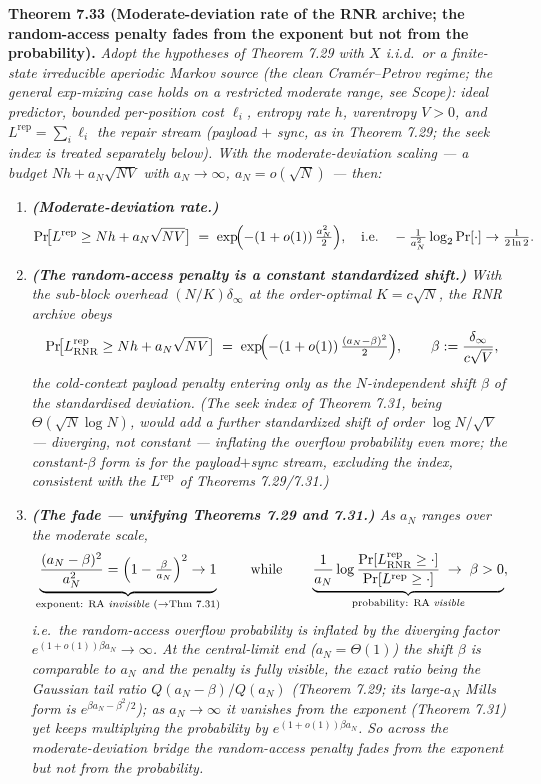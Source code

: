 \documentclass[
]{article}
\begin{document}
\textbf{Theorem 7.33 (Moderate-deviation rate of the RNR archive; the random-access
penalty fades from the exponent but not from the probability).} \emph{Adopt the
hypotheses of Theorem 7.29 with $X$ \emph{i.i.d.\ or a finite-state irreducible
aperiodic Markov} source (the clean Cram\'er--Petrov regime; the general exp-mixing
case holds on a restricted moderate range, see Scope): ideal predictor, bounded
per-position cost $\ell_i$, entropy rate $h$, varentropy $V>0$, and
$L^{\mathrm{rep}}=\sum_i\ell_i$ the \emph{repair stream} (payload $+$ sync, as in
Theorem 7.29; the seek index is treated separately below). With the
\emph{moderate-deviation} scaling --- a budget $Nh+a_N\sqrt{NV}$ with $a_N\to\infty$,
$a_N=o(\sqrt N)$ --- then:}
\begin{enumerate}
\item \emph{\textbf{(Moderate-deviation rate.)}}
\[
  \Pr\!\bigl[L^{\mathrm{rep}}\ge Nh+a_N\sqrt{NV}\bigr]
  \;=\;\exp\!\Bigl(-(1+o(1))\,\tfrac{a_N^2}{2}\Bigr),
  \quad\text{i.e.}\quad
  -\tfrac1{a_N^2}\log_2\Pr[\cdot]\to\tfrac1{2\ln2}.
\]
\item \emph{\textbf{(The random-access penalty is a constant standardized shift.)} With
the sub-block overhead $(N/K)\delta_\infty$ at the order-optimal $K=c\sqrt N$, the RNR
archive obeys}
\[
  \Pr\!\bigl[L^{\mathrm{rep}}_{\mathrm{RNR}}\ge Nh+a_N\sqrt{NV}\bigr]
  \;=\;\exp\!\Bigl(-(1+o(1))\,\tfrac{(a_N-\beta)^2}{2}\Bigr),
  \qquad \beta:=\frac{\delta_\infty}{c\sqrt V},
\]
\emph{the cold-context payload penalty entering only as the $N$-independent shift
$\beta$ of the standardised deviation. (The seek index of Theorem 7.31, being
$\Theta(\sqrt N\log N)$, would add a \emph{further} standardized shift of order
$\log N/\sqrt V$ --- diverging, not constant --- inflating the overflow probability
even more; the constant-$\beta$ form is for the payload$+$sync stream, excluding the
index, consistent with the $L^{\mathrm{rep}}$ of Theorems 7.29/7.31.)}
\item \emph{\textbf{(The fade --- unifying Theorems 7.29 and 7.31.)} As $a_N$ ranges
over the moderate scale,}
\[
  \underbrace{\frac{(a_N-\beta)^2}{a_N^2}=\Bigl(1-\tfrac{\beta}{a_N}\Bigr)^2\to1}
  _{\text{exponent: RA \emph{invisible} (}\to\text{Thm 7.31)}}
  \qquad\text{while}\qquad
  \underbrace{\frac1{a_N}\log\frac{\Pr[L^{\mathrm{rep}}_{\mathrm{RNR}}\ge\cdot]}
  {\Pr[L^{\mathrm{rep}}\ge\cdot]}\;\to\;\beta>0}_{\text{probability: RA \emph{visible}}},
\]
\emph{i.e.\ the random-access overflow probability is inflated by the diverging factor
$e^{(1+o(1))\beta a_N}\to\infty$. At the central-limit end ($a_N=\Theta(1)$) the shift
$\beta$ is comparable to $a_N$ and the penalty is fully visible, the exact ratio being
the Gaussian tail ratio $Q(a_N-\beta)/Q(a_N)$ (Theorem 7.29; its large-$a_N$ Mills form
is $e^{\beta a_N-\beta^2/2}$); as $a_N\to\infty$ it vanishes from the exponent
(Theorem 7.31) yet keeps multiplying the probability by $e^{(1+o(1))\beta a_N}$. So
across the moderate-deviation bridge the random-access penalty \emph{fades from the
exponent but not from the probability}.}
\end{enumerate}
\end{document}
